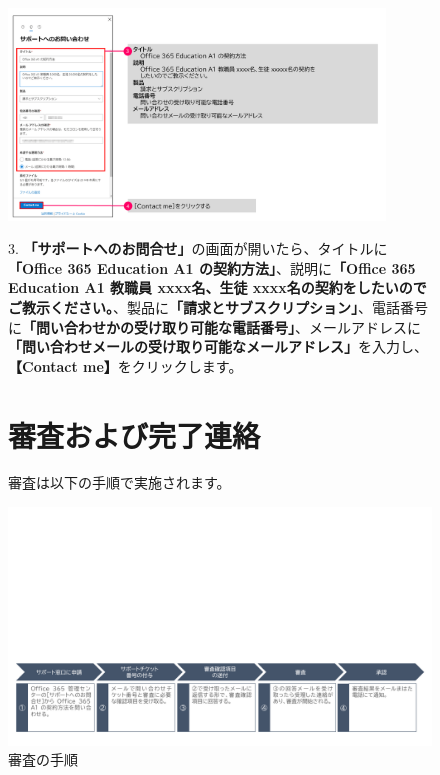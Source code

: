 \begin{figure}[h]
    \begin{minipage}{0.6\textwidth}
        \includegraphics[width=10cm]{figures/O365A1_request02.png}
    \end{minipage}
    \begin{minipage}{0.4\textwidth}
       3. \textbf{「サポートへのお問合せ」}の画面が開いたら、タイトルに\textbf{「Office 365 Education A1 の契約方法」}、説明に\textbf{「Office 365 Education A1 教職員 xxxx名、生徒 xxxx名の契約をしたいのでご教示ください。}、製品に\textbf{「請求とサブスクリプション」}、電話番号に\textbf{「問い合わせかの受け取り可能な電話番号」}、メールアドレスに\textbf{「問い合わせメールの受け取り可能なメールアドレス」}を入力し、\textbf{【Contact me】}をクリックします。
    \end{minipage}
    \vspace{6cm}
\end{figure}


\begin{figure}[t]
    \begin{minipage}{1.0\textwidth}
        \section{審査および完了連絡}
        \label{sec:Office365審査}
            審査は以下の手順で実施されます。
    \end{minipage}
\end{figure}

\begin{figure}[h]
    \centering
    \vspace{-6cm}
    \includegraphics[width=17cm]{figures/O365A1_review00.png}
    \caption{審査の手順}
    \label{fig:審査の手順}
\end{figure}

